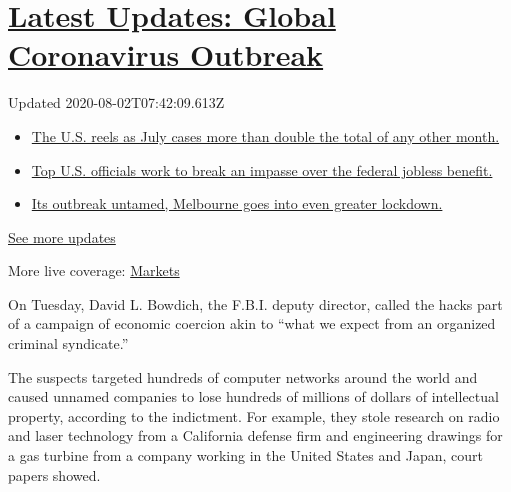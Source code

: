 \hypertarget{latest-updates-global-coronavirus-outbreak}{%
\section{\texorpdfstring{\href{https://www.nytimes.com/2020/08/01/world/coronavirus-covid-19.html?action=click\&pgtype=Article\&state=default\&region=MAIN_CONTENT_1\&context=storylines_live_updates}{Latest
Updates: Global Coronavirus
Outbreak}}{Latest Updates: Global Coronavirus Outbreak}}\label{latest-updates-global-coronavirus-outbreak}}

Updated 2020-08-02T07:42:09.613Z

\begin{itemize}
\tightlist
\item
  \href{https://www.nytimes.com/2020/08/01/world/coronavirus-covid-19.html?action=click\&pgtype=Article\&state=default\&region=MAIN_CONTENT_1\&context=storylines_live_updates\#link-34047410}{The
  U.S. reels as July cases more than double the total of any other
  month.}
\item
  \href{https://www.nytimes.com/2020/08/01/world/coronavirus-covid-19.html?action=click\&pgtype=Article\&state=default\&region=MAIN_CONTENT_1\&context=storylines_live_updates\#link-780ec966}{Top
  U.S. officials work to break an impasse over the federal jobless
  benefit.}
\item
  \href{https://www.nytimes.com/2020/08/01/world/coronavirus-covid-19.html?action=click\&pgtype=Article\&state=default\&region=MAIN_CONTENT_1\&context=storylines_live_updates\#link-2bc8948}{Its
  outbreak untamed, Melbourne goes into even greater lockdown.}
\end{itemize}

\href{https://www.nytimes.com/2020/08/01/world/coronavirus-covid-19.html?action=click\&pgtype=Article\&state=default\&region=MAIN_CONTENT_1\&context=storylines_live_updates}{See
more updates}

More live coverage:
\href{https://www.nytimes.com/live/2020/07/31/business/stock-market-today-coronavirus?action=click\&pgtype=Article\&state=default\&region=MAIN_CONTENT_1\&context=storylines_live_updates}{Markets}

On Tuesday, David L. Bowdich, the F.B.I. deputy director, called the
hacks part of a campaign of economic coercion akin to ``what we expect
from an organized criminal syndicate.''

The suspects targeted hundreds of computer networks around the world and
caused unnamed companies to lose hundreds of millions of dollars of
intellectual property, according to the indictment. For example, they
stole research on radio and laser technology from a California defense
firm and engineering drawings for a gas turbine from a company working
in the United States and Japan, court papers showed.

